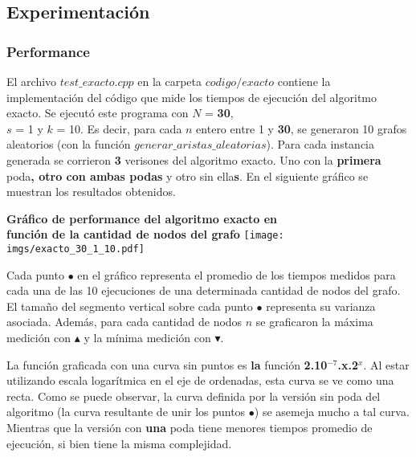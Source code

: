 {\color{dGray}\subsection{Experimentación}

\subsubsection{Performance}

\par{El archivo $test\_exacto.cpp$ en la carpeta $codigo/exacto$ contiene la
implementación del código que mide los tiempos de ejecución del algoritmo
exacto. Se ejecutó este programa con $N$ = {\color{black}\textbf{30}},\\$s$ = 1
y $k$ = 10. Es decir, para cada $n$ entero entre 1 y {\color{black}\textbf{30}},
se generaron 10 grafos aleatorios (con la función
$generar\_aristas\_aleatorias$). Para cada instancia generada se
corrieron {\color{black}\textbf{3}} verisones del algoritmo exacto. Uno con la
{\color{black}\textbf{primera}} poda{\color{black}\textbf{, otro con ambas
podas}} y otro sin ella{\color{black}\textbf{s}}.
En el siguiente gráfico se muestran los resultados obtenidos.}

\begin{center}
{\color{black}\textbf{Gráfico de performance del algoritmo exacto en\\función de la cantidad
de nodos del grafo}
\texttt{[image: imgs/exacto\_30\_1\_10.pdf]}}
\end{center}

\par{Cada punto $\bullet$ en el gráfico representa el promedio de los tiempos
medidos para cada una de las 10 ejecuciones de una determinada cantidad de nodos
del grafo. El tamaño del segmento vertical sobre cada punto $\bullet$ representa
su varianza asociada. Además, para cada cantidad de nodos $n$ se graficaron la
máxima medición con $\blacktriangle$ y la mínima medición con
$\blacktriangledown$.}\\

\par{La función graficada con una curva sin puntos es {\color{black}\textbf{la}}
función {\color{black}\textbf{2.10$^{-7}$.x.2$^x$}}. Al estar utilizando escala
logarítmica en el eje de ordenadas, esta curva
se ve como una recta. Como se puede observar, la curva definida por la versión
sin poda del algoritmo (la curva resultante de unir los puntos $\bullet$) se
asemeja mucho a tal curva. Mientras que la versión con
{\color{black}\textbf{una}} poda tiene menores tiempos promedio de ejecución,
si bien tiene la misma complejidad.}\\

}
